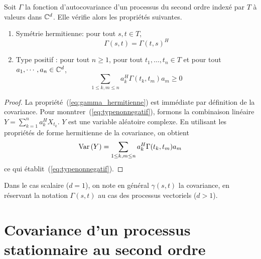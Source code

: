\begin{proposition}
 \label{prop:positifcovgene}
 Soit $\Gamma$ la fonction d'autocovariance d'un processus du second ordre
 index\'e par $T$ \`a valeurs dans $\mathbb{C}^d$. Elle v\'erifie alors les propri\'et\'es
 suivantes.
\begin{enumerate}
\item
Sym\'etrie hermitienne: pour tout $s,t \in T$,
\begin{equation}\label{eq:gamma_hermitienne}
\Gamma(s,t)= \Gamma(t,s)^H
\end{equation}
\item Type positif :
pour tout $n\geq1$, pour tout $t_1,\dots,t_n\in T$ et pour tout
$a_1,\cdots,a_n\in\mathbb{C}^d$,
\begin{equation}
\label{eq:typenonnegatif} \sum_{1 \leq k,m \leq n} a_k^H
 \Gamma(t_k,t_m)a_m \geq 0
\end{equation}
\end{enumerate}
\end{proposition}
\begin{proof}\smartqed
La propri\'et\'e~(\ref{eq:gamma_hermitienne}) est imm\'ediate par d\'efinition de la
covariance.  Pour monntrer~(\ref{eq:typenonnegatif}),
formons la combinaison lin\'eaire $Y= \sum_{k=1}^n a^H_k X_{t_k}$.
$Y$ est une variable al\'eatoire complexe. %
En utilisant les propri\'et\'es de forme hermitienne de la covariance, on obtient
\[
 \mathrm{Var}\left( Y \right)= \sum_{1 \leq k,m \leq n} a_k^H
\Gamma(t_k,t_m)a_m
\]
ce qui \'etablit~(\ref{eq:typenonnegatif}).

\end{proof}
Dans le cas scalaire ($d = 1$), on note en g\'en\'eral $\gamma(s,t)$
la covariance, en r\'eservant la notation $\Gamma(s,t)$ au cas des
processus vectoriels ($d > 1$).

\section{Covariance d'un processus stationnaire au second
ordre}

